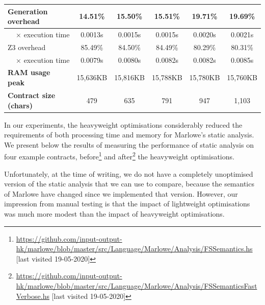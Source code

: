 \documentclass[english,runningheads]{llncs}
\begin{document}
\begin{table}[]
{\begin{tabular}{l||lllll}
Generation overhead                    & \multicolumn{1}{c|}{14.51\%}  & \multicolumn{1}{c|}{15.50\%}  & \multicolumn{1}{c|}{15.51\%}  & \multicolumn{1}{c|}{19.71\%}  & \multicolumn{1}{c}{19.69\%} \\ \hline
\multicolumn{1}{r||}{× execution time} & \multicolumn{1}{c|}{0.0013s}  & \multicolumn{1}{c|}{0.0015s}  & \multicolumn{1}{c|}{0.0015s}  & \multicolumn{1}{c|}{0.0020s}  & \multicolumn{1}{c}{0.0021s} \\ \hline
Z3 overhead                            & \multicolumn{1}{c|}{85.49\%}  & \multicolumn{1}{c|}{84.50\%}  & \multicolumn{1}{c|}{84.49\%}  & \multicolumn{1}{c|}{80.29\%}  & \multicolumn{1}{c}{80.31\%} \\ \hline
\multicolumn{1}{r||}{× execution time} & \multicolumn{1}{c|}{0.0079s}  & \multicolumn{1}{c|}{0.0080s}  & \multicolumn{1}{c|}{0.0082s}  & \multicolumn{1}{c|}{0.0082s}  & \multicolumn{1}{c}{0.0085s} \\ \hline
\textbf{RAM usage peak}                & \multicolumn{1}{c|}{15,636KB} & \multicolumn{1}{c|}{15,816KB} & \multicolumn{1}{c|}{15,788KB} & \multicolumn{1}{c|}{15,780KB} & \multicolumn{1}{c}{15,760KB} \\ \hline \hline
\textbf{Contract size (chars)}         & \multicolumn{1}{c|}{479}      & \multicolumn{1}{c|}{635}      & \multicolumn{1}{c|}{791}      & \multicolumn{1}{c|}{947}      & \multicolumn{1}{c}{1,103}
\end{tabular}
}
\vspace*{-0.6cm}
\end{table}

In our experiments, the heavyweight optimisations considerably reduced
the requirements of both processing time and memory for Marlowe's static
analysis. %
We present below the results of measuring the performance of static analysis on
four example  contracts,
before\footnote{\url{https://github.com/input-output-hk/marlowe/blob/master/src/Language/Marlowe/Analysis/FSSemantics.hs} [last visited 19-05-2020]}
and after\footnote{\url{https://github.com/input-output-hk/marlowe/blob/master/src/Language/Marlowe/Analysis/FSSemanticsFastVerbose.hs} [last visited 19-05-2020]}
the heavyweight optimisations.

\noindent
Unfortunately, at the time of writing, we do not have a completely unoptimised
version of the static analysis that we can use to compare, because the semantics
of Marlowe have changed since we implemented that version. However, our impression
from manual testing is that the impact of lightweight optimisations was much more modest than the impact of heavyweight optimisations.
\end{document}
